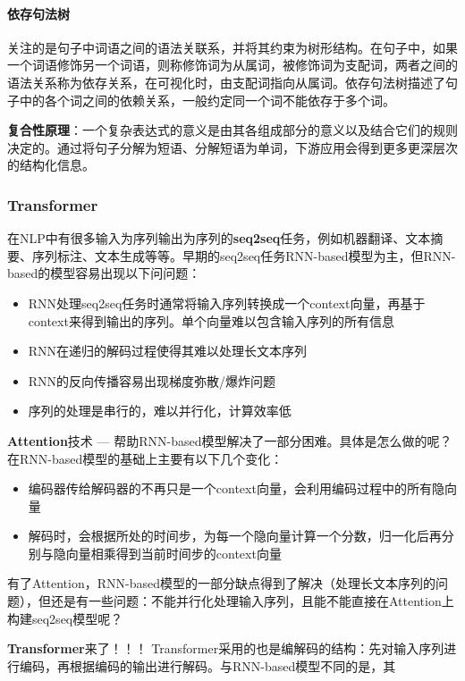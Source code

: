 \paragraph{依存句法树}关注的是句子中词语之间的语法关联系，并将其约束为树形结构。在句子中，如果一个词语修饰另一个词语，则称修饰词为从属词，被修饰词为支配词，两者之间的语法关系称为依存关系，在可视化时，由支配词指向从属词。依存句法树描述了句子中的各个词之间的依赖关系，一般约定同一个词不能依存于多个词。

\textbf{复合性原理}：一个复杂表达式的意义是由其各组成部分的意义以及结合它们的规则决定的。通过将句子分解为短语、分解短语为单词，下游应用会得到更多更深层次的结构化信息。

\subsubsection{Transformer}
在NLP中有很多输入为序列输出为序列的\textbf{seq2seq}任务，例如机器翻译、文本摘要、序列标注、文本生成等等。早期的seq2seq任务RNN-based\cite{sutskever2014sequence, cho2014learning}模型为主，但RNN-based的模型容易出现以下问问题：
\begin{itemize}
	\item RNN处理seq2seq任务时通常将输入序列转换成一个context向量，再基于context来得到输出的序列。单个向量难以包含输入序列的所有信息
	\item RNN在递归的解码过程使得其难以处理长文本序列
	\item RNN的反向传播容易出现梯度弥散/爆炸问题
	\item 序列的处理是串行的，难以并行化，计算效率低
\end{itemize}
\textbf{Attention}\cite{bahdanau2016neural, luong2015effective}技术 --- 帮助RNN-based模型解决了一部分困难。具体是怎么做的呢？在RNN-based模型的基础上主要有以下几个变化：
\begin{itemize}
	\item 编码器传给解码器的不再只是一个context向量，会利用编码过程中的所有隐向量
	\item 解码时，会根据所处的时间步，为每一个隐向量计算一个分数，归一化后再分别与隐向量相乘得到当前时间步的context向量
\end{itemize}

有了Attention，RNN-based模型的一部分缺点得到了解决（处理长文本序列的问题），但还是有一些问题：不能并行化处理输入序列，且能不能直接在Attention上构建seq2seq模型呢？

\textbf{Transformer}\cite{vaswani2017attention}来了！！！
Transformer采用的也是编解码的结构：先对输入序列进行编码，再根据编码的输出进行解码。与RNN-based模型不同的是，其
